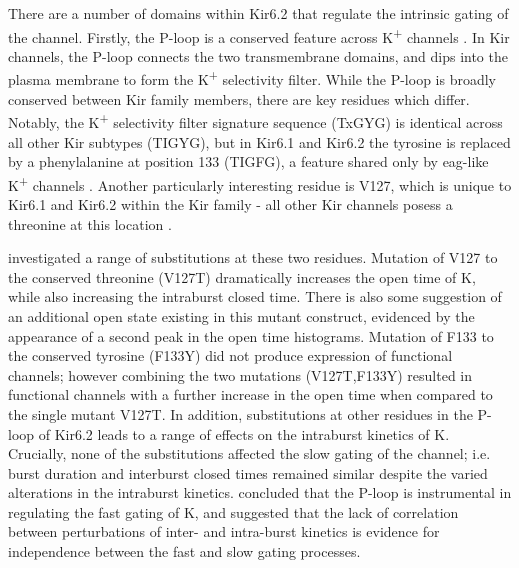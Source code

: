 There are a number of domains within Kir6.2 that regulate the intrinsic gating of the channel.
Firstly, the P-loop is a conserved feature across K\textsuperscript{+} channels \cite{kuang_structure_2015}.
In Kir channels, the P-loop connects the two transmembrane domains, and dips into the plasma membrane to form the K\textsuperscript{+} selectivity filter.
While the P-loop is broadly conserved between Kir family members, there are key residues which differ.
Notably, the K\textsuperscript{+} selectivity filter signature sequence (TxGYG) is identical across all other Kir subtypes (TIGYG), but in Kir6.1 and Kir6.2 the tyrosine is replaced by a phenylalanine at position 133 (TIGFG), a feature shared only by eag-like K\textsuperscript{+} channels \cite{heginbotham_mutations_1994}.
Another particularly interesting residue is V127, which is unique to Kir6.1 and Kir6.2 within the Kir family - all other Kir channels posess a threonine at this location \cite{proks_mutations_2001}.

\citeauthor{proks_mutations_2001} investigated a range of substitutions at these two residues.
Mutation of V127 to the conserved threonine (V127T) dramatically increases the open time of K\ATP{}, while also increasing the intraburst closed time.
There is also some suggestion of an additional open state existing in this mutant construct, evidenced by the appearance of a second peak in the open time histograms.
Mutation of F133 to the conserved tyrosine (F133Y) did not produce expression of functional channels; however combining the two mutations (V127T,F133Y) resulted in functional channels with a further increase in the open time when compared to the single mutant V127T.
In addition, substitutions at other residues in the P-loop of Kir6.2 leads to a range of effects on the intraburst kinetics of K\ATP{}.
Crucially, none of the substitutions affected the slow gating of the channel; i.e. burst duration and interburst closed times remained similar despite the varied alterations in the intraburst kinetics.
\citeauthor{proks_mutations_2001} concluded that the P-loop is instrumental in regulating the fast gating of K\ATP{}, and suggested that the lack of correlation between perturbations of inter- and intra-burst kinetics is evidence for independence between the fast and slow gating processes.

